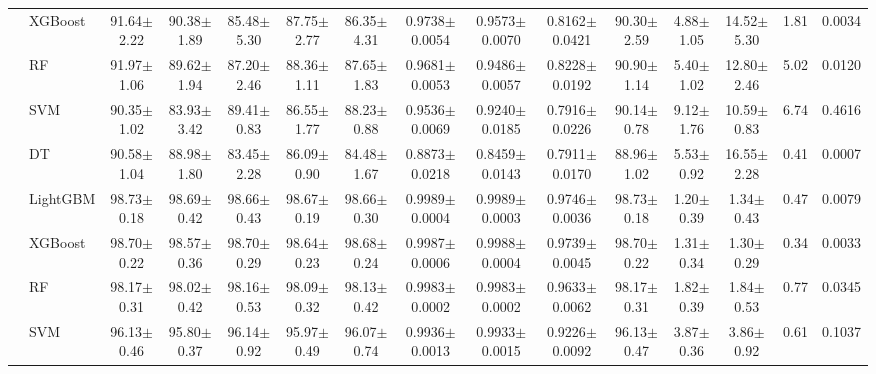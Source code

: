 \begin{tabular}{@{}llccccccccccccc@{}}
 & XGBoost & 91.64{\tiny$\pm$2.22} & 90.38{\tiny$\pm$1.89} & 85.48{\tiny$\pm$5.30} & 87.75{\tiny$\pm$2.77} & 86.35{\tiny$\pm$4.31} & 0.9738{\tiny$\pm$0.0054} & 0.9573{\tiny$\pm$0.0070} & 0.8162{\tiny$\pm$0.0421} & 90.30{\tiny$\pm$2.59} & 4.88{\tiny$\pm$1.05} & 14.52{\tiny$\pm$5.30} & 1.81 & 0.0034\\
 & RF & 91.97{\tiny$\pm$1.06} & 89.62{\tiny$\pm$1.94} & 87.20{\tiny$\pm$2.46} & 88.36{\tiny$\pm$1.11} & 87.65{\tiny$\pm$1.83} & 0.9681{\tiny$\pm$0.0053} & 0.9486{\tiny$\pm$0.0057} & 0.8228{\tiny$\pm$0.0192} & 90.90{\tiny$\pm$1.14} & 5.40{\tiny$\pm$1.02} & 12.80{\tiny$\pm$2.46} & 5.02 & 0.0120\\
 & SVM & 90.35{\tiny$\pm$1.02} & 83.93{\tiny$\pm$3.42} & 89.41{\tiny$\pm$0.83} & 86.55{\tiny$\pm$1.77} & 88.23{\tiny$\pm$0.88} & 0.9536{\tiny$\pm$0.0069} & 0.9240{\tiny$\pm$0.0185} & 0.7916{\tiny$\pm$0.0226} & 90.14{\tiny$\pm$0.78} & 9.12{\tiny$\pm$1.76} & 10.59{\tiny$\pm$0.83} & 6.74 & 0.4616\\
 & DT & 90.58{\tiny$\pm$1.04} & 88.98{\tiny$\pm$1.80} & 83.45{\tiny$\pm$2.28} & 86.09{\tiny$\pm$0.90} & 84.48{\tiny$\pm$1.67} & 0.8873{\tiny$\pm$0.0218} & 0.8459{\tiny$\pm$0.0143} & 0.7911{\tiny$\pm$0.0170} & 88.96{\tiny$\pm$1.02} & 5.53{\tiny$\pm$0.92} & 16.55{\tiny$\pm$2.28} & 0.41 & 0.0007\\
\midrule
{} & LightGBM & 98.73{\tiny$\pm$0.18} & 98.69{\tiny$\pm$0.42} & 98.66{\tiny$\pm$0.43} & 98.67{\tiny$\pm$0.19} & 98.66{\tiny$\pm$0.30} & 0.9989{\tiny$\pm$0.0004} & 0.9989{\tiny$\pm$0.0003} & 0.9746{\tiny$\pm$0.0036} & 98.73{\tiny$\pm$0.18} & 1.20{\tiny$\pm$0.39} & 1.34{\tiny$\pm$0.43} & 0.47 & 0.0079\\
 & XGBoost & 98.70{\tiny$\pm$0.22} & 98.57{\tiny$\pm$0.36} & 98.70{\tiny$\pm$0.29} & 98.64{\tiny$\pm$0.23} & 98.68{\tiny$\pm$0.24} & 0.9987{\tiny$\pm$0.0006} & 0.9988{\tiny$\pm$0.0004} & 0.9739{\tiny$\pm$0.0045} & 98.70{\tiny$\pm$0.22} & 1.31{\tiny$\pm$0.34} & 1.30{\tiny$\pm$0.29} & 0.34 & 0.0033\\
 & RF & 98.17{\tiny$\pm$0.31} & 98.02{\tiny$\pm$0.42} & 98.16{\tiny$\pm$0.53} & 98.09{\tiny$\pm$0.32} & 98.13{\tiny$\pm$0.42} & 0.9983{\tiny$\pm$0.0002} & 0.9983{\tiny$\pm$0.0002} & 0.9633{\tiny$\pm$0.0062} & 98.17{\tiny$\pm$0.31} & 1.82{\tiny$\pm$0.39} & 1.84{\tiny$\pm$0.53} & 0.77 & 0.0345\\
 & SVM & 96.13{\tiny$\pm$0.46} & 95.80{\tiny$\pm$0.37} & 96.14{\tiny$\pm$0.92} & 95.97{\tiny$\pm$0.49} & 96.07{\tiny$\pm$0.74} & 0.9936{\tiny$\pm$0.0013} & 0.9933{\tiny$\pm$0.0015} & 0.9226{\tiny$\pm$0.0092} & 96.13{\tiny$\pm$0.47} & 3.87{\tiny$\pm$0.36} & 3.86{\tiny$\pm$0.92} & 0.61 & 0.1037\\

\end{tabular}
